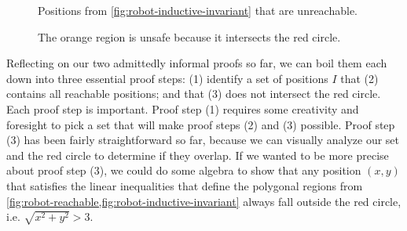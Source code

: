 \begin{figure}[t]%
  \hfil%
  \begin{minipage}{0.45\linewidth}
    \centering
    \caption{Positions from \cref{fig:robot-inductive-invariant} that are unreachable.}
    \label{fig:robot-unreachable}
  \end{minipage}%
  \hfil%
  \begin{minipage}{0.45\linewidth}
    \centering
    \caption{The orange region is unsafe because it intersects the red circle.}
    \label{fig:robot-unsafe}
  \end{minipage}%
  \hfil
\end{figure}

\begin{figure}[t]
  \centering
\end{figure}

Reflecting on our two admittedly informal proofs so far,
  we can boil them each down into three essential proof steps:
  (1) identify a set of positions $I$ that
  (2) contains all reachable positions; and that
  (3) does not intersect the red circle.
Each proof step is important.
Proof step (1) requires some creativity and foresight
  to pick a set that will make proof steps (2) and (3) possible.
Proof step (3) has been fairly straightforward so far,
  because we can visually analyze our set and the red circle
  to determine if they overlap.
If we wanted to be more precise about proof step (3),
  we could do some algebra to show that
  any position $(x, y)$ that satisfies the linear inequalities
  that define the polygonal regions from
    \cref{fig:robot-reachable,fig:robot-inductive-invariant}
  always fall outside the red circle,
  i.e. $\sqrt{x^2 + y^2} > 3$.

